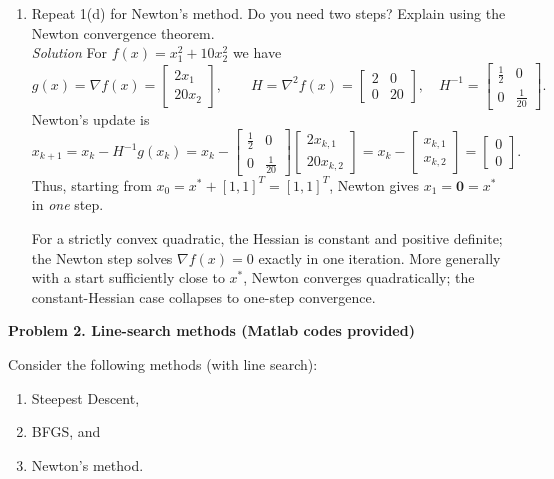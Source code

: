 \documentclass[11pt]{article}
\begin{document}
\begin{enumerate}[label=\textbf{1(\alph*)}]
		\item Repeat 1(d) for Newton's method. Do you need two steps? Explain using the Newton convergence theorem.\\
		\textit{Solution}
		For \(f(x)=x_1^2+10x_2^2\) we have
		\[
		g(x)=\nabla f(x)=\begin{bmatrix}2x_1\\20x_2\end{bmatrix},\qquad
		H=\nabla^2 f(x)=\begin{bmatrix}2&0\\0&20\end{bmatrix},\quad
		H^{-1}=\begin{bmatrix}\tfrac12&0\\[2pt]0&\tfrac1{20}\end{bmatrix}.
		\]
		Newton’s update is
		\[
		x_{k+1}=x_k - H^{-1}g(x_k)
		= x_k - \begin{bmatrix}\tfrac12&0\\[2pt]0&\tfrac1{20}\end{bmatrix}
		\begin{bmatrix}2x_{k,1}\\[2pt]20x_{k,2}\end{bmatrix}
		= x_k - \begin{bmatrix}x_{k,1}\\ x_{k,2}\end{bmatrix}
		= \begin{bmatrix}0\\0\end{bmatrix}.
		\]
		Thus, starting from \(x_0=x^\ast+[1,1]^T=[1,1]^T\), Newton gives \(x_1=\mathbf{0}=x^\ast\) in \emph{one} step.
		
		For a strictly convex quadratic, the Hessian is constant and positive definite; the Newton step solves \(\nabla f(x)=0\) exactly in one iteration. More generally with a start sufficiently close to \(x^\ast\), Newton converges quadratically; the constant-Hessian case collapses to one-step convergence.
		
	\end{enumerate}
	
	\newpage
	\noindent
	\textbf{Problem 2. Line-search methods (Matlab codes provided)}
	
	Consider the following methods (with line search):
	\begin{enumerate}[label=\arabic*.]
		\item Steepest Descent,
		\item BFGS, and
		\item Newton's method.
	\end{enumerate}
	
\end{document}
